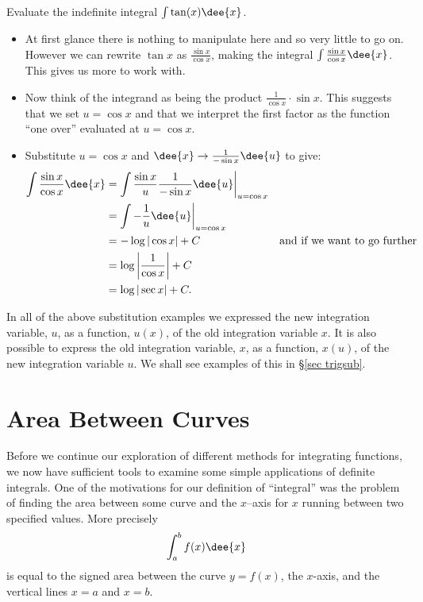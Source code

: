 \begin{eg}\label{eg:substitution9}
Evaluate the indefinite integral $\int \tan(x) \dee{x}$.

\soln
\begin{itemize}
 \item At first glance there is nothing to manipulate here and so very little to go on.
However we can rewrite $\tan x$ as $\frac{\sin x}{\cos x}$, making the integral $\int
\frac{\sin x}{\cos x}\dee{x}$. This gives us more to work with.

\item Now think of the integrand as being the product $\frac{1}{\cos x}\cdot \sin
x$. This suggests that we set $u=\cos x$ and that we interpret the first factor as the
function ``one over'' evaluated at $u=\cos x$.
\item Substitute $u = \cos x$ and $\dee{x} \rightarrow \frac{1}{-\sin x}\dee{u}$ to give:
\begin{align*}
  \int \frac{\sin x}{\cos x}\dee{x}
&=\int \frac{\sin x}{u} \frac{1}{-\sin x} \dee{u} \bigg|_{u=\cos x} \\
&= \int -\frac{1}{u}\dee{u}  \bigg|_{u=\cos x}\\
&= -\log|\cos x| +C & \text{and if we want to go further}\\
&= \log\left|\frac{1}{\cos x} \right|+C\\
&= \log|\sec x| +C.
\end{align*}
\end{itemize}
\end{eg}

In all of the above substitution examples we expressed the new integration 
variable, $u$, as a function, $u(x)$, of the old integration variable $x$. 
It is also possible to express the old integration variable, $x$, as a 
function, $x(u)$, of the new integration variable $u$. We shall see examples 
of this in \S\ref{sec trigsub}. 

\section{Area Between Curves}\label{sec area}
Before we continue our exploration of different methods for integrating functions, we
now have sufficient tools to examine some simple applications of definite integrals.
One of the motivations for our definition of ``integral'' was the problem of finding
the area between some curve and the $x$--axis for $x$ running between two
specified values. More precisely
\begin{align*}
  \int_a^b f(x) \dee{x}
\end{align*}
is equal to the signed area between the curve $y=f(x)$, the $x$-axis, and the
vertical lines $x=a$ and $x=b$.

